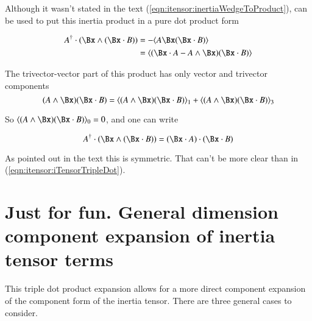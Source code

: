 Although it wasn't stated in the text (\ref{eqn:itensor:inertiaWedgeToProduct}), can
be used to put this inertia product in a pure dot product form

\begin{align*}
A^\dagger \cdot (\Bx \wedge (\Bx \cdot B) )
&= -\langle {A \Bx (\Bx \cdot B)} \rangle \\
&= \langle (\Bx \cdot A - A \wedge \Bx)(\Bx \cdot B) \rangle \\
\end{align*}

The trivector-vector part of this product has only vector and trivector components
\[
(A \wedge \Bx)(\Bx \cdot B) = \langle{ (A \wedge \Bx)(\Bx \cdot B)}\rangle_1 + \langle{(A \wedge \Bx)(\Bx \cdot B)}\rangle_3
\]

So $\langle{(A \wedge \Bx)(\Bx \cdot B)}\rangle_0 = 0$, and one can write

\begin{equation}
A^\dagger \cdot (\Bx \wedge (\Bx \cdot B) ) = (\Bx \cdot A) \cdot (\Bx \cdot B)
\end{equation}\label{eqn:itensor:iTensorTripleDot}

As pointed out in the text this is symmetric.  That can't be more clear than in (\ref{eqn:itensor:iTensorTripleDot}).

\section{Just for fun.  General dimension component expansion of inertia tensor terms }

This triple dot product expansion allows for a more direct component expansion of the component form of the inertia tensor.
There are three general cases to consider.

